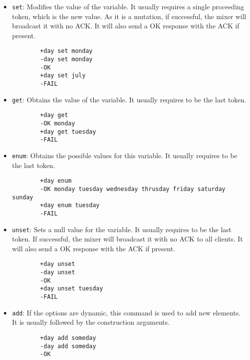 \documentclass[../main.tex]{subfiles}
\begin{document}
\begin{itemize}
    \item \texttt{set}: Modifies the value of the variable. It usually requires a single proceeding token, which is the new value. As it is a mutation, if successful, the mixer will broadcast it with no ACK. It will also send a OK response with the ACK if present.
    
    \begin{lstlisting}
        +day set monday
        -day set monday
        -OK
        +day set july
        -FAIL
    \end{lstlisting}
    
    \item \texttt{get}: Obtains the value of the variable. It usually requires to be the last token.
    
    \begin{lstlisting}
        +day get
        -OK monday
        +day get tuesday
        -FAIL
    \end{lstlisting}

    \item \texttt{enum}: Obtains the possible values for this variable. It usually requires to be the last token.
    
    \begin{lstlisting}
        +day enum
        -OK monday tuesday wednesday thrusday friday saturday sunday
        +day enum tuesday
        -FAIL
    \end{lstlisting}
    
    \item \texttt{unset}: Sets a null value for the variable. It usually requires to be the last token. If successful, the mixer will broadcast it with no ACK to all clients. It will also send a OK response with the ACK if present.
    
    \begin{lstlisting}
        +day unset
        -day unset
        -OK
        +day unset tuesday
        -FAIL
    \end{lstlisting}
    
    \item \texttt{add}: If the options are dynamic, this command is used to add new elements. It is usually followed by the construction arguments.
    
    \begin{lstlisting}
        +day add someday
        -day add someday
        -OK
    \end{lstlisting}
    

\end{itemize}
\end{document}

